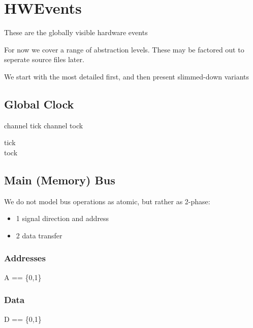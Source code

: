\section{HWEvents}


 These are the globally visible hardware events

 For now we cover a range of abstraction levels.
 These may be factored out to seperate source files later.

 We start with the most detailed first,
 and then present slimmed-down variants



\subsection{Global Clock}

\begin{cspm}
channel tick
channel tock
\end{cspm}
\begin{circus}
\circchannel tick\\  %
\circchannel tock  %
\end{circus}

\subsection{Main (Memory) Bus}

  We do not model bus operations as atomic, but rather as 2-phase:
	\begin{itemize}
   \item{1} signal direction and address
   \item{2} data transfer
	 \end{itemize}

\subsubsection{Addresses}

\begin{circus}
A == \{0,1\}
\end{circus}

\subsubsection{Data}

\begin{circus}
D == \{0,1\}
\end{circus}

